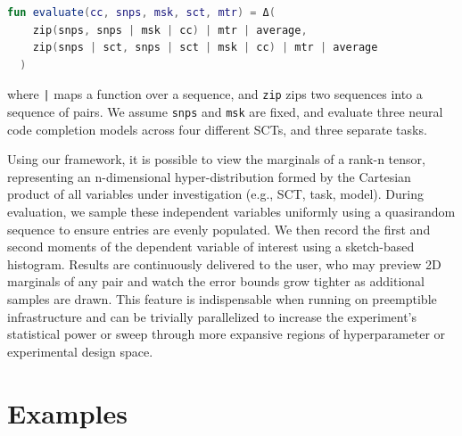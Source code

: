 \documentclass[usenames,dvipsnames]{article} %
\begin{document}
  \noindent\begin{lstlisting}[basicstyle=\footnotesize\ttfamily, language=kotlin,label={lst:lstlisting}]
  fun evaluate(cc, snps, msk, sct, mtr) = Δ(
    zip(snps, snps | msk | cc) | mtr | average,
    zip(snps | sct, snps | sct | msk | cc) | mtr | average
  )
  \end{lstlisting}

  \noindent where \texttt{|} maps a function over a sequence, and \lstinline|zip| zips two sequences into a sequence of pairs. We assume \lstinline|snps| and \lstinline|msk| are fixed, and evaluate three neural code completion models across four different SCTs, and three separate tasks.

  Using our framework, it is possible to view the marginals of a rank-n tensor, representing an n-dimensional hyper-distribution formed by the Cartesian product of all variables under investigation (e.g., SCT, task, model). During evaluation, we sample these independent variables uniformly using a quasirandom sequence to ensure entries are evenly populated. We then record the first and second moments of the dependent variable of interest using a sketch-based histogram. Results are continuously delivered to the user, who may preview 2D marginals of any pair and watch the error bounds grow tighter as additional samples are drawn. This feature is indispensable when running on preemptible infrastructure and can be trivially parallelized to increase the experiment's statistical power or sweep through more expansive regions of hyperparameter or experimental design space.

  \section{Examples}\label{sec:examples}
\end{document}

